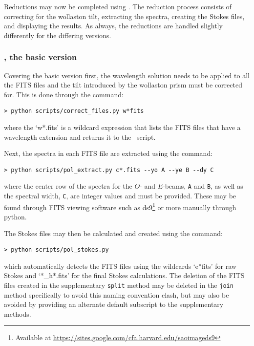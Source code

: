 Reductions may now be completed using \polsalt. The reduction process consists of correcting for the wollaston tilt, extracting the spectra, creating the Stokes files, and displaying the results. As always, the reductions are handled slightly differently for the differing versions.

\subsubsection{\polsalt, the basic version}

Covering the basic version first, the wavelength solution needs to be applied to all the \gls{FITS} files and the tilt introduced by the wollaston prism must be corrected for. This is done through the command:

\begin{verbatim}> python scripts/correct_files.py w*fits\end{verbatim}

\noindent where the `w*.fits' is a wildcard expression that lists the \gls{FITS} files that have a wavelength extension and returns it to the \polsalt\ script.

Next, the spectra in each \gls{FITS} file are extracted using the command:

\begin{verbatim}> python scripts/pol_extract.py c*.fits --yo A --ye B --dy C\end{verbatim}

\noindent where the center row of the spectra for the $O$- and $E$-beams, \texttt{A} and \texttt{B}, as well as the spectral width, \texttt{C}, are integer values and must be provided. These may be found through \gls{FITS} viewing software such as ds9\footnote{Available at \protect\url{https://sites.google.com/cfa.harvard.edu/saoimageds9}} or more manually through python.

The Stokes files may then be calculated and created using the command:

\begin{verbatim}> python scripts/pol_stokes.py\end{verbatim}

\noindent which automatically detects the \gls{FITS} files using the wildcards `e*fits' for raw Stokes and `*\_h*.fits' for the final Stokes calculations. The deletion of the \gls{FITS} files created in the supplementary \texttt{split} method may be deleted in the \texttt{join} method specifically to avoid this naming convention clash, but may also be avoided by providing an alternate default subscript to the supplementary methods.

